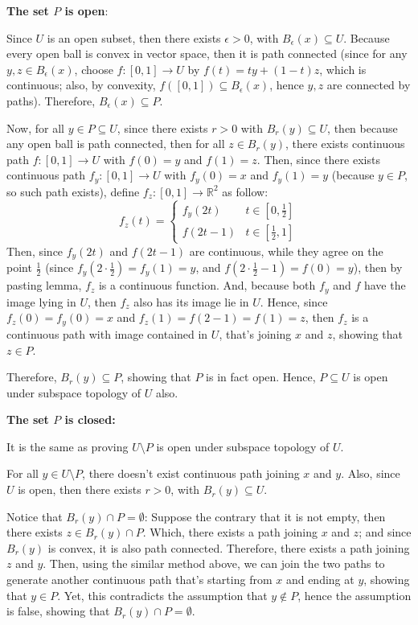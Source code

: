 \documentclass{article}
\begin{document}
\textbf{The set $P$ is open}: 

Since $U$ is an open subset, then there exists $\epsilon>0$, with $B_\epsilon(x)\subseteq U$. Because every open ball is convex in vector space,
then it is path connected (since for any $y,z\in B_\epsilon(x)$, choose $f:[0,1]\rightarrow U$ by $f(t)=ty+(1-t)z$, which is continuous;
also, by convexity, $f([0,1])\subseteq B_\epsilon(x)$, hence $y,z$ are connected by paths). Therefore, $B_\epsilon(x)\subseteq P$.

Now, for all $y\in P\subseteq U$, since there exists $r>0$ with $B_r(y)\subseteq U$, then because any open ball is path connected, then for all $z\in B_r(y)$, there exists continuous path
$f:[0,1]\rightarrow U$ with $f(0)=y$ and $f(1)=z$.
Then, since there exists continuous path $f_y:[0,1]\rightarrow U$ with $f_y(0)=x$ and $f_y(1)=y$ (because $y\in P$, so such path exists), define $f_z:[0,1]\rightarrow \mathbb{R}^2$ as follow:
$$f_z(t)=\begin{cases}
    f_y\left(2t\right) & t\in [0,\frac{1}{2}]\\
    f\left(2t-1\right) & t\in [\frac{1}{2},1]
\end{cases}$$
Then, since $f_y(2t)$ and $f(2t-1)$ are continuous, while they agree on the point $\frac{1}{2}$ (since $f_y(2\cdot \frac{1}{2})=f_y(1)=y$, and $f(2\cdot\frac{1}{2}-1)=f(0)=y$),
then by pasting lemma, $f_z$ is a continuous function. And, because both $f_y$ and $f$ have the image lying in $U$, then $f_z$ also has its image lie in $U$. Hence, 
since $f_z(0)=f_y(0)=x$ and $f_z(1)=f(2-1)=f(1)=z$, then $f_z$ is a continuous path with image contained in $U$, that's joining $x$ and $z$, showing that $z\in P$.

Therefore, $B_r(y)\subseteq P$, showing that $P$ is in fact open. Hence, $P\subseteq U$ is open under subspace topology of $U$ also.

\hfil

\textbf{The set $P$ is closed:}

It is the same as proving $U\setminus P$ is open under subspace topology of $U$.

For all $y\in U\setminus P$, there doesn't exist continuous path joining $x$ and $y$. Also, since $U$ is open, then there exists $r>0$, with $B_r(y)\subseteq U$.

Notice that $B_r(y)\cap P = \emptyset$: Suppose the contrary that it is not empty, then there exists $z\in B_r(y)\cap P$.
Which, there exists a path joining $x$ and $z$; and since $B_r(y)$ is convex, it is also path connected. Therefore, there exists a path joining $z$ and $y$.
Then, using the similar method above, we can join the two paths to generate another continuous path that's starting from $x$ and ending at $y$, showing that $y\in P$.
Yet, this contradicts the assumption that $y\notin P$, hence the assumption is false, showing that $B_r(y)\cap P=\emptyset$.
\end{document}
